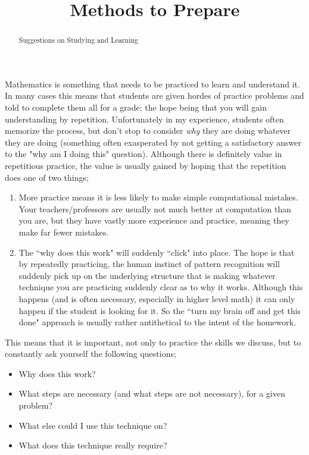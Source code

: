 \documentclass{ximeraXloud}
\title{Methods to Prepare}
\begin{document}
\begin{abstract}
Suggestions on Studying and Learning
\end{abstract}
\maketitle


Mathematics is something that needs to be practiced to learn and understand it. In many cases this means that students are given hordes of practice problems and told to complete them all for a grade; the hope being that you will gain understanding by repetition. Unfortunately in my experience, students often memorize the process, but don't stop to consider \textit{why} they are doing whatever they are doing (something often exasperated by not getting a satisfactory answer to the "why am I doing this" question). Although there is definitely value in repetitious practice, the value is usually gained by hoping that the repetition does one of two things;
\begin{enumerate}
\item More practice means it is less likely to make simple computational mistakes. Your teachers/professors are usually not much better at computation than you are, but they have vastly more experience and practice, meaning they make far fewer mistakes.
\item The ``why does this work" will suddenly ``click" into place. The hope is that by repeatedly practicing, the human instinct of pattern recognition will suddenly pick up on the underlying structure that is making whatever technique you are practicing suddenly clear as to why it works. Although this happens (and is often necessary, especially in higher level math) it can only happen if the student is looking for it. So the ``turn my brain off and get this done" approach is usually rather antithetical to the intent of the homework.
\end{enumerate}

This means that it is important, not only to practice the skills we discuss, but to constantly ask yourself the following questions;
\begin{itemize}
    \item Why does this work?
    \item What steps are necessary (and what steps are not necessary), for a given problem?
    \item What else could I use this technique on? 
    \item What does this technique really require?
\end{itemize}
\end{document}
